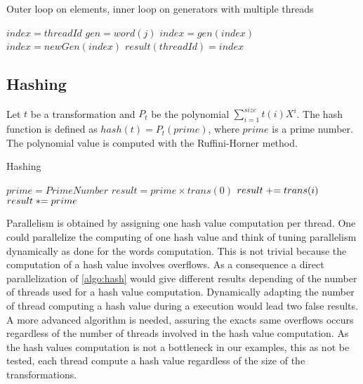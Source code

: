 {\begin{algorithm}
\caption{Outer loop on elements, inner loop on generators with multiple threads}
\label{algo:composepar}
\begin{algorithmic}
\STATE $index = threadId$
\STATE $gen = word(j)$
\STATE $index = gen(index)$
\ENDFOR
\STATE $index = newGen(index)$
\STATE $result(threadId) = index$
\ENDIF
\end{algorithmic}
\end{algorithm}


\subsection{Hashing}
\label{part:hash}
Let $t$ be a transformation and $P_{t}$ be the polynomial $\displaystyle\sum_{i=1}^{size} t(i)X^i$. The hash function is defined as $hash(t) = P_{t}(prime)$, where $prime$ is a prime number.
The polynomial value is computed with the Ruffini-Horner method.
\begin{algorithm}
\caption{Hashing}
\label{algo:hash}
\begin{algorithmic}
\STATE $prime = PrimeNumber$
\STATE $result = prime \times trans(0)$
\STATE $\switch result += trans(i)$
\STATE $\switch result *= prime$
\ENDFOR
\end{algorithmic}
\end{algorithm}
Parallelism is obtained by assigning one hash value computation per thread.
One could parallelize the computing of one hash value and think of tuning parallelism dynamically as done for the words computation. 
This is not trivial because the computation of a hash value involves overflows. 
As a consequence a direct parallelization of \autoref{algo:hash} would give different results depending of the number of threads used for a hash value computation. 
Dynamically adapting the number of thread computing a hash value during a execution would lead two false results. 
A more advanced algorithm is needed, assuring the exacts same overflows occurs regardless of the number of threads involved in the hash value computation. 
As the hash values computation is not a bottleneck in our examples, this as not be tested, each thread compute a hash value regardless of the size of the transformations.


}
